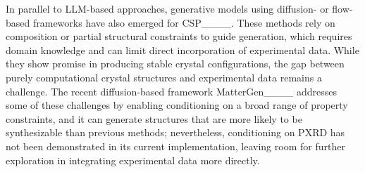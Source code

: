 In parallel to LLM-based approaches, generative models using diffusion- or flow-based frameworks have also emerged for CSP____. These methods rely on composition or partial structural constraints to guide generation, which requires domain knowledge and can limit direct incorporation of experimental data. While they show promise in producing stable crystal configurations, the gap between purely computational crystal structures and experimental data remains a challenge. The recent diffusion-based framework MatterGen____ addresses some of these challenges by enabling conditioning on a broad range of property constraints, and it can generate structures that are more likely to be synthesizable than previous methods; nevertheless, conditioning on PXRD has not been demonstrated in its current implementation, leaving room for further exploration in integrating experimental data more directly.